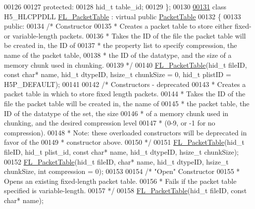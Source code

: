 \begin{DoxyCode}
00126 
00127 \textcolor{keyword}{protected}:
00128     hid\_t table\_id;
00129 \};
00130 
\hyperlink{class_f_l___packet_table}{00131} \textcolor{keyword}{class }H5\_HLCPPDLL \hyperlink{class_f_l___packet_table}{FL\_PacketTable} : \textcolor{keyword}{virtual} \textcolor{keyword}{public} \hyperlink{class_packet_table}{PacketTable}
00132 \{
00133 \textcolor{keyword}{public}:
00134     \textcolor{comment}{/* Constructor}
00135 \textcolor{comment}{     * Creates a packet table to store either fixed- or variable-length packets.}
00136 \textcolor{comment}{     * Takes the ID of the file the packet table will be created in, the ID of}
00137 \textcolor{comment}{     * the property list to specify compression, the name of the packet table,}
00138 \textcolor{comment}{     * the ID of the datatype, and the size of a memory chunk used in chunking.}
00139 \textcolor{comment}{     */}
00140     \hyperlink{class_f_l___packet_table}{FL\_PacketTable}(hid\_t fileID, \textcolor{keyword}{const} \textcolor{keywordtype}{char}* name, hid\_t dtypeID, hsize\_t chunkSize = 0, 
      hid\_t plistID = H5P\_DEFAULT);
00141 
00142     \textcolor{comment}{/* Constructors - deprecated}
00143 \textcolor{comment}{     * Creates a packet table in which to store fixed length packets.}
00144 \textcolor{comment}{     * Takes the ID of the file the packet table will be created in, the name of}
00145 \textcolor{comment}{     * the packet table, the ID of the datatype of the set, the size}
00146 \textcolor{comment}{     * of a memory chunk used in chunking, and the desired compression level}
00147 \textcolor{comment}{     * (0-9, or -1 for no compression).}
00148 \textcolor{comment}{     * Note: these overloaded constructors will be deprecated in favor of the}
00149 \textcolor{comment}{     * constructor above.}
00150 \textcolor{comment}{     */}
00151     \hyperlink{class_f_l___packet_table}{FL\_PacketTable}(hid\_t fileID, hid\_t plist\_id, \textcolor{keyword}{const} \textcolor{keywordtype}{char}* name, hid\_t dtypeID, hsize\_t 
      chunkSize);
00152     \hyperlink{class_f_l___packet_table}{FL\_PacketTable}(hid\_t fileID, \textcolor{keywordtype}{char}* name, hid\_t dtypeID, hsize\_t chunkSize, \textcolor{keywordtype}{int} 
      compression = 0);
00153 
00154     \textcolor{comment}{/* "Open" Constructor}
00155 \textcolor{comment}{     * Opens an existing fixed-length packet table.}
00156 \textcolor{comment}{     * Fails if the packet table specified is variable-length.}
00157 \textcolor{comment}{     */}
00158     \hyperlink{class_f_l___packet_table}{FL\_PacketTable}(hid\_t fileID, \textcolor{keyword}{const} \textcolor{keywordtype}{char}* name);

\end{DoxyCode}
